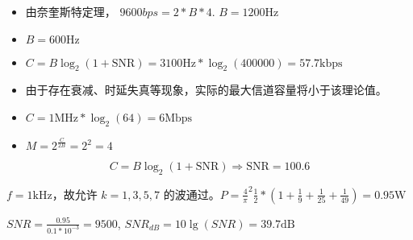 \begin{nproblem}[3.16]
\end{nproblem}
\begin{nsolution}
    \begin{itemize}
        \item 由奈奎斯特定理， $9600bps=2*B*4$. $B=1200\text{Hz}$
        \item $B=600\text{Hz}$
    \end{itemize}
\end{nsolution}

\begin{nproblem}[3.18]
\end{nproblem}
\begin{nsolution}
    \begin{itemize}
        \item $C=B\log_2(1+\text{SNR})=3100\text{Hz}*\log_2(400000)=57.7\text{kbps}$
        \item 由于存在衰减、时延失真等现象，实际的最大信道容量将小于该理论值。
    \end{itemize}
\end{nsolution}

\begin{nproblem}[3.20]
\end{nproblem}
\begin{nsolution}
    \begin{itemize}
        \item $C=1\text{MHz}*\log_2(64)=6\text{Mbps}$
        \item $M=2^\frac{C}{2B}=2^2=4$
    \end{itemize}
\end{nsolution}

\begin{nproblem}[3.21]
\end{nproblem}
\begin{nsolution}
    \[C=B\log_2(1+\text{SNR})\Rightarrow \text{SNR}=100.6\]
\end{nsolution}

\begin{nproblem}[3.22]
\end{nproblem}
\begin{nsolution}
    $f=1\text{kHz}$，故允许 $k=1,3,5,7$ 的波通过。$P=\frac{4}{\pi}^2\frac{1}{2}*(1+\frac{1}{9}+\frac{1}{25}+\frac{1}{49})=0.95\text{W}$

    $SNR=\frac{0.95}{0.1*10^{-3}}=9500$, $SNR_{dB}=10\lg(SNR)=39.7\text{dB}$
\end{nsolution}

